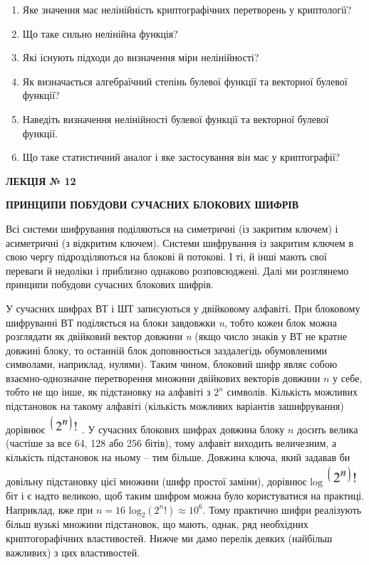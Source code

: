 \documentclass[a4paper]{article}
\newcommand\liststyleWWviiiNumi{%
\renewcommand\theenumi{\arabic{enumi}}
\renewcommand\theenumii{\alph{enumii}}
\renewcommand\theenumiii{\roman{enumiii}}
\renewcommand\theenumiv{\arabic{enumiv}}
\renewcommand\labelenumi{\theenumi.}
\renewcommand\labelenumii{\theenumii.}
\renewcommand\labelenumiii{\theenumiii.}
\renewcommand\labelenumiv{\theenumiv.}
}
\newcounter{}
\begin{document}
\bigskip

\liststyleWWviiiNumi
\begin{enumerate}
\item Яке значення має нелінійність криптографічних перетворень у криптології?
\item Що таке сильно нелінійна функція?
\item Які існують підходи до визначення міри нелінійності?
\item Як визначається алгебраїчний степінь булевої функції та векторної булевої
функції?
\item Наведіть визначення нелінійності булевої функції та  векторної булевої
функції.
\item Що таке статистичний аналог і яке застосування він має у криптографії?
\end{enumerate}
{\bfseries
ЛЕКЦІЯ № 12}


\bigskip

{\centering\bfseries
ПРИНЦИПИ ПОБУДОВИ СУЧАСНИХ БЛОКОВИХ ШИФРІВ
\par}


\bigskip


\bigskip

Всі системи шифрування поділяються на симетричні (із закритим ключем) і
асиметричні (з відкритим ключем). Системи шифрування із закритим ключем в свою
чергу підрозділяються на блокові й потокові. І ті, й інші мають свої переваги й
недоліки і  приблизно однаково розповсюджені. Далі ми розглянемо принципи
побудови сучасних блокових шифрів.

У сучасних шифрах ВТ і ШТ записуються у двійковому алфавіті. При блоковому
шифруванні ВТ поділяється на блоки завдовжки \textit{n}, тобто кожен блок можна
розглядати як двійковий вектор довжини \textit{n }(якщо число знаків у ВТ не
кратне довжині блоку, то останній блок доповнюється заздалегідь обумовленими
символами, наприклад, нулями). Таким чином, блоковий шифр являє собою
взаємно-однозначне перетворення множини двійкових векторів довжини  ${n}$ у
себе, тобто не що інше, як підстановку на алфавіті з  ${2^{{n}}}$ символів.
Кількість  можливих підстановок на такому алфавіті (кількість можливих
варіантів зашифрування)  дорівнює 
\includegraphics[width=0.4374in,height=0.2909in]{crypt-img/crypt-img292.png} .
У сучасних блокових шифрах довжина блоку  ${n}$ досить велика (частіше за все
64,  128 або 256 бітів), тому алфавіт виходить величезним, а кількість
підстановок на ньому – тим більше. Довжина ключа, який задавав би довільну
підстановку  цієї множини (шифр простої заміни), дорівнює  ${\text{log}}$
\includegraphics[width=0.4646in,height=0.3134in]{crypt-img/crypt-img293.png} 
біт і є надто великою, щоб таким шифром можна було користуватися на практиці.
Наприклад, вже при  ${n=\text{16}}$   ${\text{log}_{{2}}(2^{{n}}!)\approx
\text{10}^{{6}}}$. Тому практично шифри реалізують більш вузькі множини
підстановок, що мають, однак, ряд необхідних криптогорафічних властивостей.
Нижче ми дамо перелік деяких (найбільш важливих) з цих властивостей.
\end{document}
